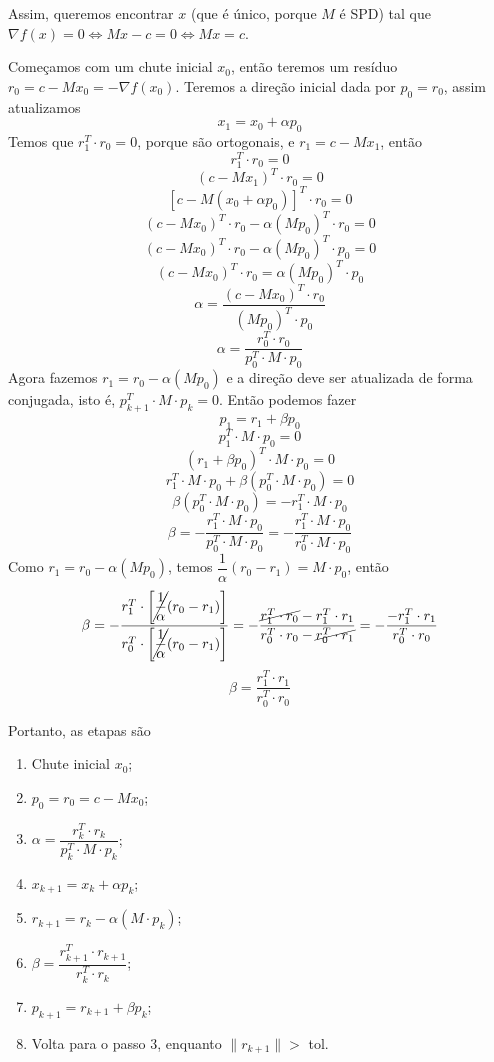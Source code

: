 \documentclass{article}
\begin{document}
    \newpage

    Assim, queremos encontrar $x$ (que é único, porque $M$ é SPD) tal que $\nabla f(x) = 0 \iff Mx-c = 0 \iff Mx = c$.

    Começamos com um chute inicial $x_0$, então teremos um resíduo $r_0 = c - Mx_0 = -\nabla f(x_0)$. Teremos a direção inicial dada por $p_0 = r_0$, assim atualizamos
    \[x_1 = x_0 + \alpha p_0\]
    Temos que $r_1^T \cdot r_0 = 0$, porque são ortogonais, e $r_1 = c-Mx_1$, então
    \[r_1^T \cdot r_0 = 0\]
    \[(c-Mx_1)^T \cdot r_0 = 0\]
    \[[c-M(x_0 + \alpha p_0)]^T \cdot r_0 = 0\]
    \[(c-Mx_0)^T \cdot r_0 - \alpha(Mp_0)^T \cdot r_0 = 0\]
    \[(c-Mx_0)^T \cdot r_0 - \alpha(Mp_0)^T \cdot p_0 = 0\]
    \[(c-Mx_0)^T \cdot r_0 = \alpha(Mp_0)^T \cdot p_0\]
    \[\alpha = \frac{(c-Mx_0)^T \cdot r_0}{(Mp_0)^T \cdot p_0}\]
    \[\alpha = \frac{r_0^T \cdot r_0}{p_0^T \cdot M \cdot p_0}\]
    Agora fazemos $r_1 = r_0 - \alpha(Mp_0)$ e a direção deve ser atualizada de forma conjugada, isto é, $p_{k+1}^T \cdot M \cdot p_k = 0$. Então podemos fazer
    \[p_1 = r_1 + \beta p_0\]
    \[p_{1}^T \cdot M \cdot p_0 = 0\]
    \[(r_1 + \beta p_0)^T \cdot M \cdot p_0 = 0\]
    \[r_1^T \cdot M \cdot p_0 + \beta (p_0^T \cdot M \cdot p_0) = 0\]
    \[\beta (p_0^T \cdot M \cdot p_0) = -r_1^T \cdot M \cdot p_0\]
    \[\beta = -\frac{r_1^T \cdot M \cdot p_0}{p_0^T \cdot M \cdot p_0} = -\frac{r_1^T \cdot M \cdot p_0}{r_0^T \cdot M \cdot p_0}\]
    Como $r_1 = r_0 - \alpha(Mp_0)$, temos $\dfrac{1}{\alpha}(r_0 - r_1) = M \cdot p_0$, então
    \[\beta = -\frac{r_1^T \cdot \left[\cancel{\dfrac{1}{\alpha}}(r_0 - r_1)\right]}{r_0^T \cdot \left[\cancel{\dfrac{1}{\alpha}}(r_0 - r_1)\right]} = - \frac{\cancel{r_1^T \cdot r_0} - r_1^T \cdot r_1}{r_0^T \cdot r_0 - \cancel{r_0^T \cdot r_1}} = - \frac{- r_1^T \cdot r_1}{r_0^T \cdot r_0}\]
    \[\beta = \frac{r_1^T \cdot r_1}{r_0^T \cdot r_0}\]

    \newpage

    Portanto, as etapas são
    {\hspace{2cm}
    \begin{enumerate}[leftmargin=2cm]
        \item Chute inicial $x_0$;
        \item $p_0 = r_0 = c - Mx_0$;
        \item $\alpha = \dfrac{r_k^T \cdot r_k}{p_k^T \cdot M \cdot p_k}$;
        \item $x_{k+1} = x_k + \alpha p_k$;
        \item $r_{k+1} = r_k - \alpha (M \cdot p_k)$;
        \item $\beta = \dfrac{r_{k+1}^T \cdot r_{k+1}}{r_k^T \cdot r_k}$;
        \item $p_{k+1} = r_{k+1} + \beta p_k$;
        \item Volta para o passo 3, enquanto $\|r_{k+1}\| > $ tol.
    \end{enumerate}
    }
\end{document}
